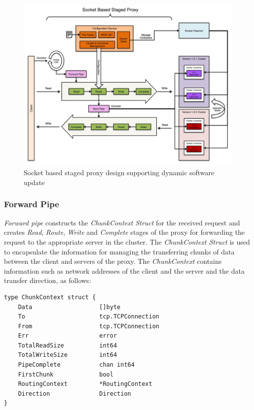 \documentclass[a4paper,11pt,twoside]{report}
\begin{document}
\begin{figure}[!ht]
  \centering
     \includegraphics[scale=0.30]{proxy}
  \caption{Socket based staged proxy design supporting dynamic software update}
  \label{proxy}
\end{figure}

\subsubsection*{Forward Pipe} 
\textit{Forward pipe} constructs the \textit{ChunkContext Struct} for the received request and creates \textit{Read}, \textit{Route}, \textit{Write} and \textit{Complete} stages of the proxy for forwarding the request to the appropriate server in the cluster. The \textit{ChunkContext Struct} is used to encapsulate the information for managing the transferring chunks of data between the client and servers of the proxy. The \textit{ChunkContext} contains information such as network addresses of the client and the server and the data transfer direction, as follows: \bigskip  

\begin{lstlisting}[language=terminal]
type ChunkContext struct {
	Data                   []byte
	To                     tcp.TCPConnection
	From                   tcp.TCPConnection
	Err                    error
	TotalReadSize          int64
	TotalWriteSize         int64
	PipeComplete           chan int64
	FirstChunk             bool
	RoutingContext         *RoutingContext
	Direction              Direction
}
\end{lstlisting}
\end{document}

